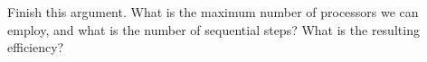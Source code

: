   Finish this argument. What is the maximum number of processors we
  can employ, and what is the number of sequential steps? What is the
  resulting efficiency?
